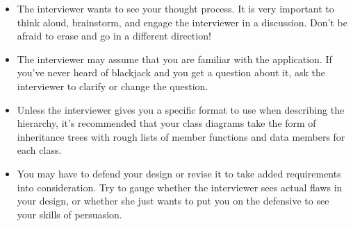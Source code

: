 \begin{itemize}
\item
The interviewer wants to see your thought process. It is very important to think aloud, brainstorm, and engage the interviewer in a discussion. Don’t be afraid to erase and go in a different direction!

\item
The interviewer may assume that you are familiar with the application. If you’ve never heard of blackjack and you get a question about it, ask the interviewer to clarify or change the question.

\item
Unless the interviewer gives you a specific format to use when describing the hierarchy, it’s recommended that your class diagrams take the form of inheritance trees with rough lists of member functions and data members for each class.

\item
You may have to defend your design or revise it to take added requirements into consideration. Try to gauge whether the interviewer sees actual flaws in your design, or whether she just wants to put you on the defensive to see your skills of persuasion.
\end{itemize}















